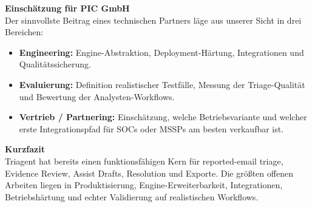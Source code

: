 \documentclass[10pt,a4paper]{article}
\begin{document}
\vspace{0.35em}
\noindent\textbf{Einschätzung für PIC GmbH}\\
Der sinnvollste Beitrag eines technischen Partners läge aus unserer Sicht in drei Bereichen:
\begin{itemize}
  \item \textbf{Engineering:} Engine-Abstraktion, Deployment-Härtung, Integrationen und Qualitätssicherung.
  \item \textbf{Evaluierung:} Definition realistischer Testfälle, Messung der Triage-Qualität und Bewertung der Analysten-Workflows.
  \item \textbf{Vertrieb / Partnering:} Einschätzung, welche Betriebsvariante und welcher erste Integrationspfad für SOCs oder MSSPs am besten verkaufbar ist.
\end{itemize}

\noindent\textbf{Kurzfazit}\\
Triagent hat bereits einen funktionsfähigen Kern für reported-email triage, Evidence Review, Assist Drafts, Resolution und Exporte. Die größten offenen Arbeiten liegen in Produktisierung, Engine-Erweiterbarkeit, Integrationen, Betriebshärtung und echter Validierung auf realistischen Workflows.
\end{document}
